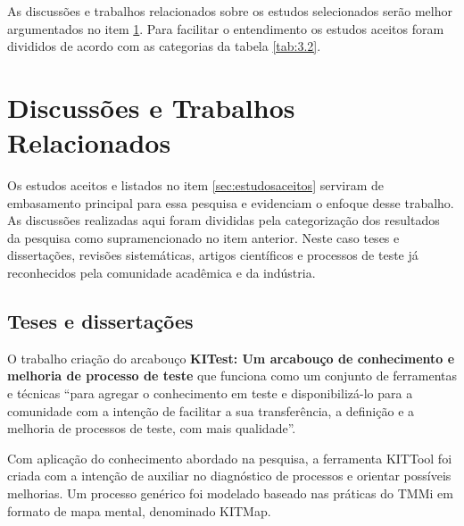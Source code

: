 \begin{table}[ht]
\centering
\caption{Quantitativo dos principais trabalhos aceitos para essa pesquisa.}
\label{tab:3.2}
\end{table}

As discussões e trabalhos relacionados sobre os estudos selecionados serão melhor argumentados no item \ref{sec:discussoes}. Para facilitar o entendimento os estudos aceitos foram divididos de acordo com as categorias da tabela \ref{tab:3.2}.

\section{Discussões e Trabalhos Relacionados}
\label{sec:discussoes}

Os estudos aceitos e listados no item \ref{sec:estudosaceitos} serviram de embasamento principal para essa pesquisa e evidenciam o enfoque desse trabalho. As discussões realizadas aqui foram divididas pela categorização dos resultados da pesquisa como supramencionado no item anterior. Neste caso teses e dissertações, revisões sistemáticas, artigos científicos e processos de teste já reconhecidos pela comunidade acadêmica e da indústria.

\subsection{Teses e dissertações}
\label{sec:tesesdissertacoes}

O trabalho criação do arcabouço \textbf{KITest: Um arcabouço de conhecimento e melhoria de processo de teste} \cite{Nina2011} que funciona como um conjunto de ferramentas e técnicas “para agregar o conhecimento em teste e disponibilizá-lo para a comunidade com a intenção de facilitar a sua transferência, a definição e a melhoria de processos de teste, com mais qualidade”. 

Com aplicação do conhecimento abordado na pesquisa, a ferramenta KITTool foi criada com a intenção de auxiliar no diagnóstico de processos e orientar possíveis melhorias. Um processo genérico foi modelado baseado nas práticas do TMMi em formato de mapa mental, denominado KITMap.


